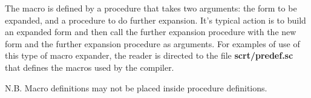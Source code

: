 \documentclass[10pt]{article}
\begin{document}
The macro is defined by a procedure that takes two arguments:
the form to be expanded, and a procedure to do further
expansion.  It's typical action is to build an expanded form
and then call the further expansion procedure with the new form and the
further expansion procedure as arguments.  For examples of use
of this type of macro expander, the reader is directed to the
file \textbf{scrt/predef.sc} that defines the macros
used by the compiler.

N.B.  Macro definitions may not be placed inside procedure
definitions.
\end{document}
